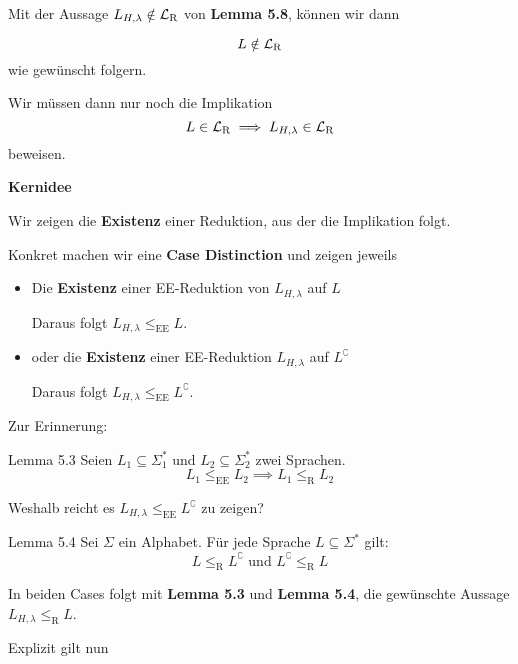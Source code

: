         Mit der Aussage $L_{H, \lambda} \notin \mathcal{L}_\text{R}$ von \textbf{Lemma 5.8}, können wir dann 
    
        $$L \notin \mathcal{L}_\text{R}$$
        wie gewünscht folgern.
    
    
        Wir müssen dann nur noch die Implikation 
        $$L \in \mathcal{L}_\text{R} \implies L_{H, \lambda} \in \mathcal{L}_\text{R}$$
        beweisen.
        
    
        \textbf{Kernidee}
        \begin{center}
            Wir zeigen die \textbf{Existenz} einer Reduktion, aus der die Implikation folgt. 
        \end{center}
        
        Konkret machen wir eine \textbf{Case Distinction} und zeigen jeweils 
        \begin{itemize}[label=-]
            \item Die \textbf{Existenz} einer EE-Reduktion von $L_{H, \lambda}$ auf  $L$
            
            Daraus folgt $L_{H, \lambda} \leq_{\text{EE}} L$.
            \item oder die \textbf{Existenz} einer EE-Reduktion $L_{H, \lambda} $ auf $ L^\complement$
            
            Daraus folgt $L_{H, \lambda} \leq_{\text{EE}} L^\complement$.
        \end{itemize}
        Zur Erinnerung:
    
        \begin{mainbox}{Lemma 5.3}
            Seien $L_1 \subseteq \Sigma_{1}^*$ und $L_2 \subseteq \Sigma_{2}^*$ zwei Sprachen.
            $$L_1 \leq_{\text{EE}} L_2 \implies L_1 \leq_{\text{R}} L_2$$
        \end{mainbox}
    
        Weshalb reicht es $L_{H, \lambda} \leq_{\text{EE}} L^\complement$ zu zeigen?
    
        
        \begin{mainbox}{Lemma 5.4}
            Sei $\Sigma$ ein Alphabet. Für jede Sprache $L \subseteq \Sigma^*$ gilt:
         $$L \leq_\text{R} L^\complement \text{ und } L^\complement \leq_\text{R} L$$
        \end{mainbox}
    
        In beiden Cases folgt mit \textbf{Lemma 5.3} und \textbf{Lemma 5.4}, die gewünschte Aussage $L_{H, \lambda} \leq_{\text{R}} L$.
    
        Explizit gilt nun
    
